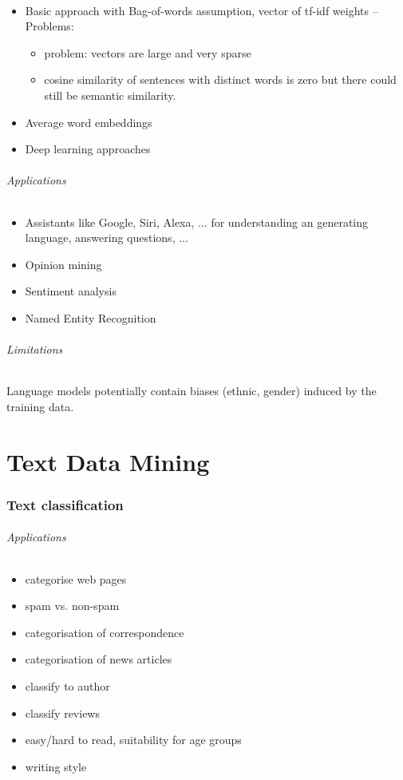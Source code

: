 \documentclass[10pt,twocolumn]{article}
\begin{document}
\paragraph{} \begin{itemize}
\item Basic approach with Bag-of-words assumption, vector of tf-idf weights -- Problems:
  \begin{itemize}
  \item problem: vectors are large and very sparse
  \item cosine similarity of sentences with distinct words is zero but there
    could still be semantic similarity.
  \end{itemize}
\item Average word embeddings
\item Deep learning approaches
\end{itemize}

\paragraph{\textit{Applications}}
\begin{itemize}
\item Assistants like Google, Siri, Alexa, ... for understanding an generating
  language, answering questions, ...
\item Opinion mining
\item Sentiment analysis
\item Named Entity Recognition
\end{itemize}

\paragraph{\textit{Limitations}} Language models potentially contain biases
(ethnic, gender) induced by the training data.


\pagebreak
\part{Text Data Mining}

\section{Text classification}
\paragraph{\textit{Applications}}
\begin{itemize}
\item categorise web pages
\item spam vs. non-spam
\item categorisation of correspondence
\item categorisation of news articles
\item classify to author
\item classify reviews
\item easy/hard to read, suitability for age groups
\item writing style
\end{itemize}
\end{document}
